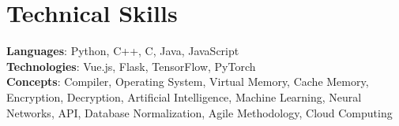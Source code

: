 \section{Technical Skills}
    \begin{itemize}[leftmargin=0.15in, label={}]
	\small{\item{
		\textbf{Languages}{: Python, C++, C, Java, JavaScript} \\
		\textbf{Technologies}{: Vue.js, Flask, TensorFlow, PyTorch} \\
		\textbf{Concepts}{: Compiler, Operating System, Virtual Memory, Cache Memory, Encryption, Decryption, Artificial Intelligence, Machine Learning, Neural Networks, API, Database Normalization, Agile Methodology, Cloud Computing}
	}}
    \end{itemize}